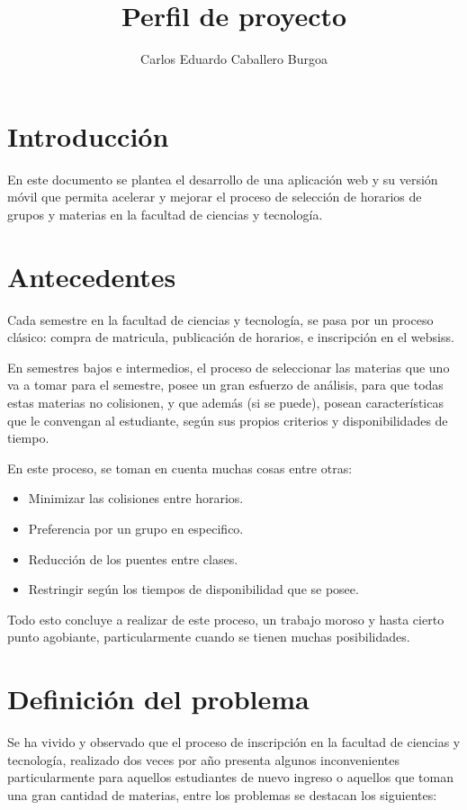 \documentclass[letterpaper,11pt]{article}
\title{Perfil de proyecto}
\author{Carlos Eduardo Caballero Burgoa}
\begin{document}
\maketitle
\section{Introducción}
En este documento se plantea el desarrollo de una aplicación web y su versión
móvil que permita acelerar y mejorar el proceso de selección de horarios de
grupos y materias en la facultad de ciencias y tecnología.

\section{Antecedentes}
Cada semestre en la facultad de ciencias y tecnología, se pasa por un proceso
clásico: compra de matricula, publicación de horarios, e inscripción en el
websiss.

En semestres bajos e intermedios, el proceso de seleccionar las materias que uno
va a tomar para el semestre, posee un gran esfuerzo de análisis, para que todas
estas materias no colisionen, y que además (si se puede), posean características
que le convengan al estudiante, según sus propios criterios y disponibilidades
de tiempo.

En este proceso, se toman en cuenta muchas cosas entre otras:

\begin{itemize}
\item Minimizar las colisiones entre horarios.
\item Preferencia por un grupo en especifico.
\item Reducción de los puentes entre clases.
\item Restringir según los tiempos de disponibilidad que se posee.
\end{itemize}

Todo esto concluye a realizar de este proceso, un trabajo moroso y hasta
cierto punto agobiante, particularmente cuando se tienen muchas posibilidades.

\section{Definición del problema}
Se ha vivido y observado que el proceso de inscripción en la facultad de
ciencias y tecnología, realizado dos veces por año presenta algunos
inconvenientes particularmente para aquellos estudiantes de nuevo ingreso o
aquellos que toman una gran cantidad de materias, entre los problemas se
destacan los siguientes:
\end{document}
